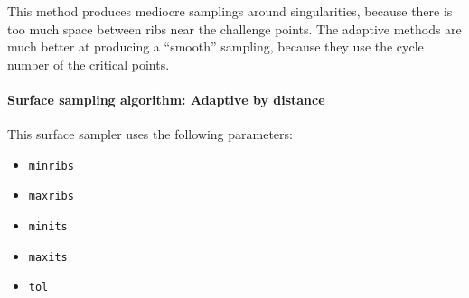This method produces mediocre samplings around singularities, because there is too much space between ribs near the challenge points.  The adaptive methods are much better at producing a ``smooth'' sampling, because they use the cycle number of the critical points.











\paragraph{Surface sampling algorithm: Adaptive by distance}

This surface sampler uses the following parameters:
\begin{itemize}[noitemsep]
  \item {\tt minribs}
  \item {\tt maxribs}
  \item {\tt minits}
  \item {\tt maxits}
  \item {\tt tol}
\end{itemize}


